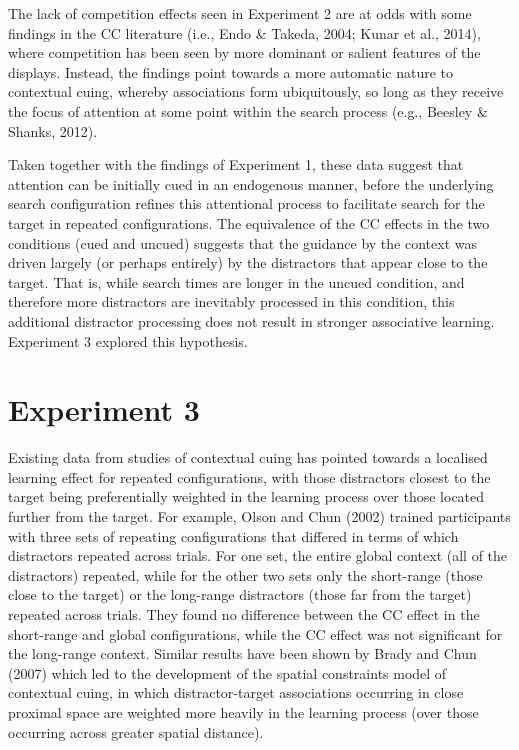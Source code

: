 \documentclass[
  man,floatsintext]{apa7}
\begin{document}
The lack of competition effects seen in Experiment 2 are at odds with some findings in the CC literature (i.e., Endo \& Takeda, 2004; Kunar et al., 2014), where competition has been seen by more dominant or salient features of the displays. Instead, the findings point towards a more automatic nature to contextual cuing, whereby associations form ubiquitously, so long as they receive the focus of attention at some point within the search process (e.g., Beesley \& Shanks, 2012).

Taken together with the findings of Experiment 1, these data suggest that attention can be initially cued in an endogenous manner, before the underlying search configuration refines this attentional process to facilitate search for the target in repeated configurations. The equivalence of the CC effects in the two conditions (cued and uncued) suggests that the guidance by the context was driven largely (or perhaps entirely) by the distractors that appear close to the target. That is, while search times are longer in the uncued condition, and therefore more distractors are inevitably processed in this condition, this additional distractor processing does not result in stronger associative learning. Experiment 3 explored this hypothesis.

\hypertarget{experiment-3}{%
\section{Experiment 3}\label{experiment-3}}

Existing data from studies of contextual cuing has pointed towards a localised learning effect for repeated configurations, with those distractors closest to the target being preferentially weighted in the learning process over those located further from the target. For example, Olson and Chun (2002) trained participants with three sets of repeating configurations that differed in terms of which distractors repeated across trials. For one set, the entire global context (all of the distractors) repeated, while for the other two sets only the short-range (those close to the target) or the long-range distractors (those far from the target) repeated across trials. They found no difference between the CC effect in the short-range and global configurations, while the CC effect was not significant for the long-range context. Similar results have been shown by Brady and Chun (2007) which led to the development of the spatial constraints model of contextual cuing, in which distractor-target associations occurring in close proximal space are weighted more heavily in the learning process (over those occurring across greater spatial distance).
\end{document}
